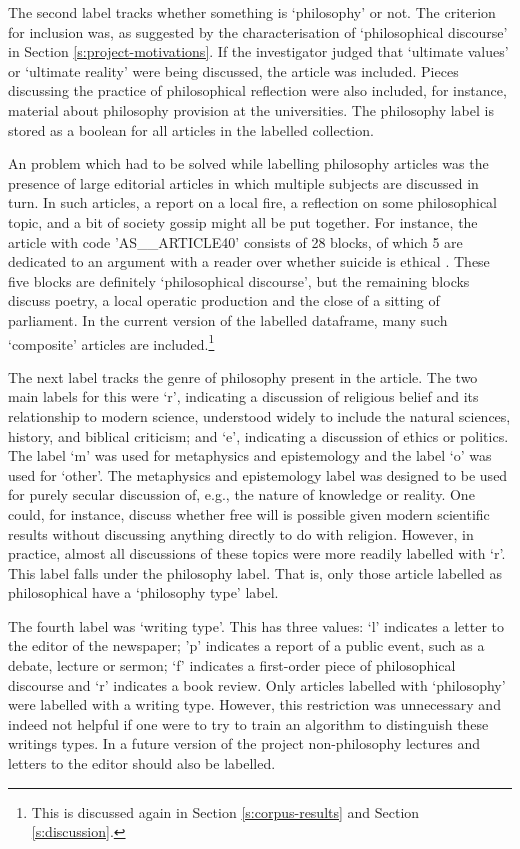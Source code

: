 \documentclass{article}
\begin{document}
The second label tracks whether something is `philosophy' or not. The criterion for inclusion was, as suggested by the characterisation of `philosophical discourse' in Section \ref{s:project-motivations}. If the investigator judged that `ultimate values' or `ultimate reality' were being discussed, the article was included. Pieces discussing the practice of philosophical reflection were also included, for instance, material about philosophy provision at the universities. The philosophy label is stored as a boolean for all articles in the labelled collection.

An problem which had to be solved while labelling philosophy articles was the presence of large editorial articles in which multiple subjects are discussed in turn. In such articles, a report on a local fire, a reflection on some philosophical topic, and a bit of society gossip might all be put together. For instance, the article with code 'AS\_\_\-ARTICLE40' consists of 28 blocks, of which 5 are dedicated to an argument with a reader over whether suicide is ethical \cite{suicide-example}. These five blocks are definitely `philosophical discourse', but the remaining blocks discuss poetry, a local operatic production and the close of a sitting of parliament. In the current version of the labelled dataframe, many such `composite' articles are included.\footnote{This is discussed again in Section \ref{s:corpus-results} and Section \ref{s:discussion}.}

The next label tracks the genre of philosophy present in the article. The two main labels for this were `r', indicating a discussion of religious belief and its relationship to modern science, understood widely to include the natural sciences, history, and biblical criticism; and `e', indicating a discussion of ethics or politics. The label `m' was used for metaphysics and epistemology and the label `o' was used for `other'. The metaphysics and epistemology label was designed to be used for purely secular discussion of, e.g., the nature of knowledge or reality. One could, for instance, discuss whether free will is possible given modern scientific results without discussing anything directly to do with religion. However, in practice, almost all discussions of these topics were more readily labelled with `r'. This label falls under the philosophy label. That is, only those article labelled as philosophical have a `philosophy type' label.

The fourth label was `writing type'. This has three values: `l' indicates a letter to the editor of the newspaper; 'p' indicates a report of a public event, such as a debate, lecture or sermon; `f' indicates a first-order piece of philosophical discourse and `r' indicates a book review. Only articles labelled with `philosophy' were labelled with a writing type. However, this restriction was unnecessary and indeed not helpful if one were to try to train an algorithm to distinguish these writings types. In a future version of the project non-philosophy lectures and letters to the editor should also be labelled.
\end{document}
